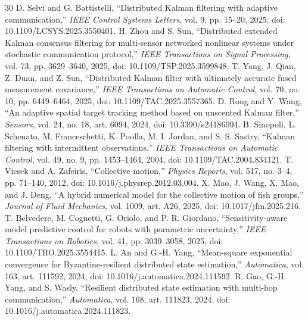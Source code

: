 \documentclass[UTF8,fontset=windows,11pt]{ctexart}
\begin{document}
\begin{thebibliography}{30}
 D. Selvi and G. Battistelli, ``Distributed Kalman filtering with adaptive communication,'' \emph{IEEE Control Systems Letters}, vol. 9, pp. 15--20, 2025, doi: 10.1109/LCSYS.2025.3550401.
 H. Zhou and S. Sun, ``Distributed extended Kalman consensus filtering for multi-sensor networked nonlinear systems under stochastic communication protocol,'' \emph{IEEE Transactions on Signal Processing}, vol. 73, pp. 3629--3640, 2025, doi: 10.1109/TSP.2025.3599848.
 T. Yang, J. Qian, Z. Duan, and Z. Sun, ``Distributed Kalman filter with ultimately accurate fused measurement covariance,'' \emph{IEEE Transactions on Automatic Control}, vol. 70, no. 10, pp. 6449--6464, 2025, doi: 10.1109/TAC.2025.3557365.
 D. Rong and Y. Wang, ``An adaptive spatial target tracking method based on unscented Kalman filter,'' \emph{Sensors}, vol. 24, no. 18, art. 6094, 2024, doi: 10.3390/s24186094.
 B. Sinopoli, L. Schenato, M. Franceschetti, K. Poolla, M. I. Jordan, and S. S. Sastry, ``Kalman filtering with intermittent observations,'' \emph{IEEE Transactions on Automatic Control}, vol. 49, no. 9, pp. 1453--1464, 2004, doi: 10.1109/TAC.2004.834121.
 T. Vicsek and A. Zafeiris, ``Collective motion,'' \emph{Physics Reports}, vol. 517, no. 3--4, pp. 71--140, 2012, doi: 10.1016/j.physrep.2012.03.004.
 X. Mao, J. Wang, X. Mao, and J. Deng, ``A hybrid numerical model for the collective motion of fish groups,'' \emph{Journal of Fluid Mechanics}, vol. 1009, art. A26, 2025, doi: 10.1017/jfm.2025.216.
 T. Belvedere, M. Cognetti, G. Oriolo, and P. R. Giordano, ``Sensitivity-aware model predictive control for robots with parametric uncertainty,'' \emph{IEEE Transactions on Robotics}, vol. 41, pp. 3039--3058, 2025, doi: 10.1109/TRO.2025.3554415.
 L. An and G.-H. Yang, ``Mean-square exponential convergence for Byzantine-resilient distributed state estimation,'' \emph{Automatica}, vol. 163, art. 111592, 2024, doi: 10.1016/j.automatica.2024.111592.
 R. Gao, G.-H. Yang, and S. Wasly, ``Resilient distributed state estimation with multi-hop communication,'' \emph{Automatica}, vol. 168, art. 111823, 2024, doi: 10.1016/j.automatica.2024.111823.
\end{thebibliography}
\end{document}
